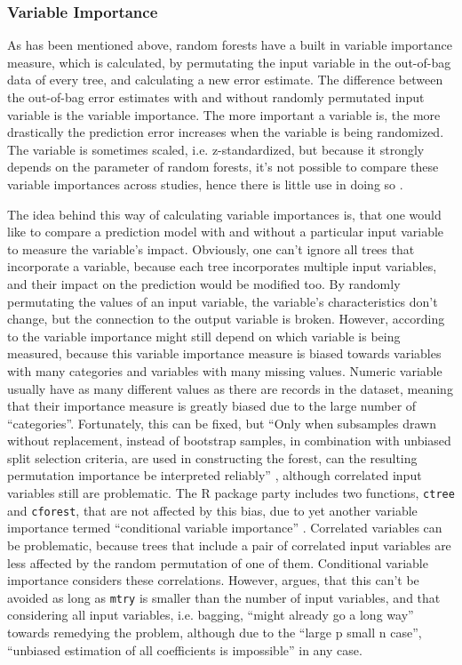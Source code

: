\documentclass[a4paper,man,12pt,apacite]{apa6} %
\begin{document}
\subsubsection{Variable Importance}
As has been mentioned above, random forests have a built in variable
importance measure, which is calculated, by permutating the input variable
in the out-of-bag data of every tree, and calculating a new error estimate.
The difference between the out-of-bag error estimates with and without
randomly permutated input variable is the variable importance.
The more important a variable is, the more drastically the prediction error
increases when the variable is being randomized.
The variable is sometimes scaled, i.e. z-standardized,
but because it strongly depends on the parameter of random forests,
it's not possible to compare these variable importances across studies,
hence there is little use in doing so \cite{strobl2009introduction}.

The idea behind this way of calculating variable importances is,
that one would like to compare a prediction model with and without a
particular input variable to measure the variable's impact.
Obviously, one can't ignore all trees that incorporate a variable,
because each tree incorporates multiple input variables, and their impact
on the prediction would be modified too.
By randomly permutating the values of an input variable,
the variable's characteristics don't change, but the connection to the
output variable is broken.
However, according to \cite{strobl2007bias} the variable importance might
still depend on which variable is being measured, because this
variable importance measure is biased towards variables with many categories
and variables with many missing values.
Numeric variable usually have as many different values as there are records
in the dataset, meaning that their importance measure is greatly biased due
to the large number of “categories”.
Fortunately, this can be fixed, but “Only when subsamples drawn without
replacement, instead of bootstrap samples, in combination with unbiased
split selection criteria, are used in constructing the forest, can the
resulting permutation importance be interpreted reliably”
\cite{strobl2007bias}, although correlated input variables still are
problematic.
The R package party includes two functions, \texttt{ctree} and
\texttt{cforest}, that are not affected by this bias, due to
yet another variable importance termed “conditional variable importance”
\cite{strobl2008conditional}.
Correlated variables can be problematic, because trees that include a
pair of correlated input variables are less affected by the random
permutation of one of them.
Conditional variable importance considers these correlations.
However, \cite{gromping2009variable} argues, that this can't be avoided
as long as \texttt{mtry} is smaller than the number of input variables,
and that considering all input variables, i.e. bagging,
“might already go a long way” towards remedying the problem,
although due to the “large p small n case”, “unbiased estimation of all
coefficients is impossible” in any case.
\end{document}
